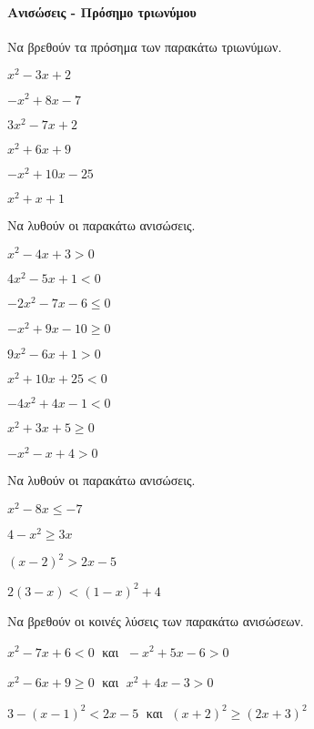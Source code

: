 \documentclass[11pt,a4paper,modern]{FFExercises}
\begin{document}
\paragraph{Ανισώσεις - Πρόσημο τριωνύμου}
\askhsh Να βρεθούν τα πρόσημα των παρακάτω τριωνύμων.
\begin{multicols}{2}
\begin{alist}
\item $ x^2-3x+2 $
\item $ -x^2+8x-7 $
\item $ 3x^2-7x+2 $
\item $ x^2+6x+9 $
\item $ -x^2+10x-25 $
\item $ x^2+x+1 $
\end{alist}
\end{multicols}
\askhsh Να λυθούν οι παρακάτω ανισώσεις.
\begin{multicols}{2}
\begin{alist}
\item $ x^2-4x+3>0 $
\item $ 4x^2-5x+1<0 $
\item $ -2x^2-7x-6\leq0 $
\item $ -x^2+9x-10\geq0 $
\item $ 9x^2-6x+1>0 $
\item $ x^2+10x+25<0 $
\item $ -4x^2+4x-1<0 $
\item $ x^2+3x+5\geq0 $
\item $ -x^2-x+4>0 $
\end{alist}
\end{multicols}
\askhsh Να λυθούν οι παρακάτω ανισώσεις.
\begin{multicols}{2}
\begin{alist}
\item $ x^2-8x\leq -7 $
\item $ 4-x^2\geq 3x $
\item $ (x-2)^2>2x-5 $
\item $ 2(3-x)<(1-x)^2+4 $
\end{alist}
\end{multicols}
\askhsh Να βρεθούν οι κοινές λύσεις των παρακάτω ανισώσεων.
\begin{alist}
\item $ x^2-7x+6<0 \;$ και $\; -x^2+5x-6>0 $
\item $ x^2-6x+9\geq0 \;$ και $\; x^2+4x-3>0 $
\item $ 3-(x-1)^2<2x-5 \;$ και $\; (x+2)^2\geq(2x+3)^2 $
\end{alist}
\end{document}
